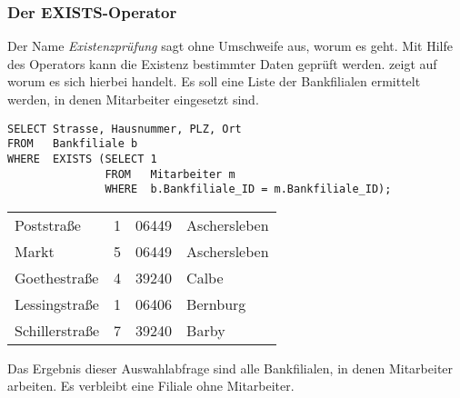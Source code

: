 				\subsubsection{Der EXISTS-Operator}
          Der Name \textit{Existenzprüfung} sagt ohne Umschweife aus, worum es geht. Mit Hilfe des Operators  kann die Existenz bestimmter Daten geprüft werden.  zeigt auf worum es sich hierbei handelt. Es soll eine Liste der Bankfilialen ermittelt werden, in denen Mitarbeiter eingesetzt sind.
          \begin{lstlisting}[language=oracle_sql,caption={Der \languageorasql{EXISTS}-Operator},label=sql06_08]
SELECT Strasse, Hausnummer, PLZ, Ort
FROM   Bankfiliale b
WHERE  EXISTS (SELECT 1
               FROM   Mitarbeiter m
               WHERE  b.Bankfiliale_ID = m.Bankfiliale_ID);
          \end{lstlisting}
          \begin{center}
            \begin{small}
              \tablehead{}
              \tabletail {
              }
              \begin{msoraclesql}
                \begin{supertabular}{llll}
                  Poststraße & 1 & 06449 & Aschersleben \\
                  Markt & 5 & 06449 & Aschersleben \\
                  Goethestraße & 4 & 39240 & Calbe \\
                  Lessingstraße & 1 & 06406 & Bernburg \\
                  Schillerstraße & 7 & 39240 & Barby \\
                \end{supertabular}
              \end{msoraclesql}
            \end{small}
          \end{center}
          Das Ergebnis dieser Auswahlabfrage sind alle Bankfilialen, in denen Mitarbeiter arbeiten. Es verbleibt eine Filiale ohne Mitarbeiter.

